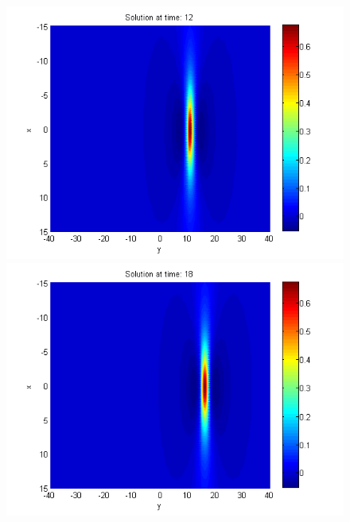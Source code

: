 \documentclass{article}
\begin{document}
\begin{figure}[ht]
\begin{minipage}[b]{0.33\linewidth}
		 \includegraphics[width=\linewidth]{../amitans/figures/solution_128x90_bt1_c090_T12.png}
	\end{minipage}
	\begin{minipage}[b]{0.33\linewidth}
		\includegraphics[width=\linewidth]{../amitans/figures/solution_128x90_bt1_c090_T18.png}
	\end{minipage}	
	\begin{minipage}[b]{0.33\linewidth}

\end{minipage}
\end{figure}
\end{document}

